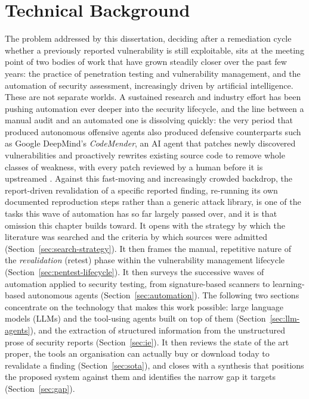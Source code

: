 \chapter{Technical Background}
\label{ch:sota}

\setlength{\emergencystretch}{3em}

The problem addressed by this dissertation, deciding after a remediation
cycle whether a previously reported vulnerability is still exploitable, sits at
the meeting point of two bodies of work that have grown steadily closer over the
past few years: the practice of penetration testing and vulnerability management,
and the automation of security assessment, increasingly driven by artificial
intelligence. These are not separate worlds. A sustained research and industry
effort has been pushing automation ever deeper into the security lifecycle, and the
line between a manual audit and an automated one is dissolving quickly: the very
period that produced autonomous offensive agents also produced defensive
counterparts such as Google DeepMind's \emph{CodeMender}, an AI agent that patches
newly discovered vulnerabilities and proactively rewrites existing source code to
remove whole classes of weakness, with every patch reviewed by a human before it is
upstreamed \cite{codemender}. Against this fast-moving and increasingly crowded
backdrop, the report-driven revalidation of a specific reported finding, re-running
its own documented reproduction steps rather than a generic attack library, is one of
the tasks this wave of automation has so far largely passed over, and it is that
omission this chapter builds toward. It opens with the strategy by which the
literature was searched and the criteria by which sources were admitted
(Section~\ref{sec:search-strategy}). It then frames the manual, repetitive nature of the
\emph{revalidation} (retest) phase within the vulnerability management lifecycle
(Section~\ref{sec:pentest-lifecycle}). It then surveys the successive waves of
automation applied to security testing, from signature-based scanners to
learning-based autonomous agents (Section~\ref{sec:automation}). The following
two sections concentrate on the technology that makes this work possible: large
language models (LLMs) and the tool-using agents built on top of them
(Section~\ref{sec:llm-agents}), and the extraction of structured information from
the unstructured prose of security reports (Section~\ref{sec:ie}). It then reviews
the state of the art proper, the tools an organisation can actually buy or download
today to revalidate a finding (Section~\ref{sec:sota}), and closes with a synthesis
that positions the proposed system against them and identifies the narrow gap it
targets (Section~\ref{sec:gap}).

